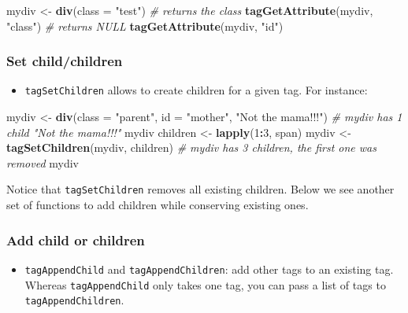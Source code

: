 \documentclass[
]{book}
\newenvironment{Shaded}{\begin{snugshade}}{\end{snugshade}}
\newcommand{\CommentTok}[1]{\textcolor[rgb]{0.56,0.35,0.01}{\textit{#1}}}
\newcommand{\DataTypeTok}[1]{\textcolor[rgb]{0.13,0.29,0.53}{#1}}
\newcommand{\DecValTok}[1]{\textcolor[rgb]{0.00,0.00,0.81}{#1}}
\newcommand{\KeywordTok}[1]{\textcolor[rgb]{0.13,0.29,0.53}{\textbf{#1}}}
\newcommand{\NormalTok}[1]{#1}
\newcommand{\OperatorTok}[1]{\textcolor[rgb]{0.81,0.36,0.00}{\textbf{#1}}}
\newcommand{\StringTok}[1]{\textcolor[rgb]{0.31,0.60,0.02}{#1}}
\providecommand{\tightlist}{%
  \setlength{\itemsep}{0pt}\setlength{\parskip}{0pt}}
\begin{document}
\begin{Shaded}
\begin{Highlighting}[]
\NormalTok{mydiv <-}\StringTok{ }\KeywordTok{div}\NormalTok{(}\DataTypeTok{class =} \StringTok{"test"}\NormalTok{)}
\CommentTok{# returns the class}
\KeywordTok{tagGetAttribute}\NormalTok{(mydiv, }\StringTok{"class"}\NormalTok{)}
\CommentTok{# returns NULL}
\KeywordTok{tagGetAttribute}\NormalTok{(mydiv, }\StringTok{"id"}\NormalTok{)}
\end{Highlighting}
\end{Shaded}

\hypertarget{set-childchildren}{%
\subsubsection{Set child/children}\label{set-childchildren}}

\begin{itemize}
\tightlist
\item
  \texttt{tagSetChildren} allows to create children for a given tag. For instance:
\end{itemize}

\begin{Shaded}
\begin{Highlighting}[]
\NormalTok{mydiv <-}\StringTok{ }\KeywordTok{div}\NormalTok{(}\DataTypeTok{class =} \StringTok{"parent"}\NormalTok{, }\DataTypeTok{id =} \StringTok{"mother"}\NormalTok{, }\StringTok{"Not the mama!!!"}\NormalTok{)}
\CommentTok{# mydiv has 1 child "Not the mama!!!"}
\NormalTok{mydiv }
\NormalTok{children <-}\StringTok{ }\KeywordTok{lapply}\NormalTok{(}\DecValTok{1}\OperatorTok{:}\DecValTok{3}\NormalTok{, span)}
\NormalTok{mydiv <-}\StringTok{ }\KeywordTok{tagSetChildren}\NormalTok{(mydiv, children)}
\CommentTok{# mydiv has 3 children, the first one was removed}
\NormalTok{mydiv }
\end{Highlighting}
\end{Shaded}

Notice that \texttt{tagSetChildren} removes all existing children. Below we see another set of functions to add children while conserving existing ones.

\hypertarget{add-child-or-children}{%
\subsubsection{Add child or children}\label{add-child-or-children}}

\begin{itemize}
\tightlist
\item
  \texttt{tagAppendChild} and \texttt{tagAppendChildren}: add other tags to an existing tag.
  Whereas \texttt{tagAppendChild} only takes one tag, you can pass a list of tags to \texttt{tagAppendChildren}.
\end{itemize}
\end{document}
